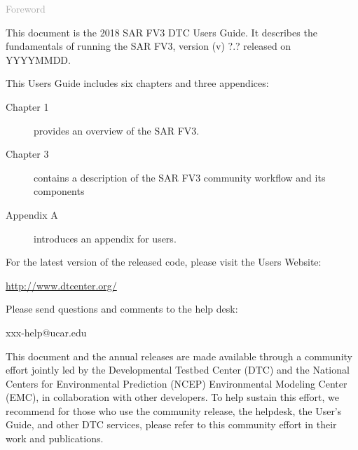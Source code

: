 \begin{titlepage}
\vspace*{0.5cm}
\noindent

\begin{flushleft}
\textcolor{darkgray}{\LARGE Foreword}
\vspace*{1cm}\par

This document is the 2018 SAR FV3 DTC User\textquotesingle s Guide. It describes the fundamentals of running the SAR FV3, version (v) ?.? released on YYYYMMDD. 

This User\textquotesingle s Guide includes six chapters and three appendices:
\begin{description}
\item[Chapter 1] provides an overview of the SAR FV3.
\item[Chapter 3] contains a description of the SAR FV3 community workflow and its components 
\item[Appendix A] introduces an appendix for users.
\end{description}

For the latest version of the released code, please visit the User\textquotesingle s Website:
\begin{center}
\url{http://www.dtcenter.org/}
\end{center}

Please send questions and comments to the help desk:
\begin{center}
xxx-help@ucar.edu
\end{center}

This document and the annual releases are made available through a community effort jointly led by the Developmental Testbed Center (DTC) and the National Centers for Environmental Prediction (NCEP) Environmental Modeling Center (EMC), in collaboration with other developers. To help sustain this effort, we recommend for those who use the community release, the  helpdesk, the User's Guide, and other DTC services, please refer to this community effort in their work and publications. 


\end{flushleft}
\end{titlepage}
\pagebreak{}




